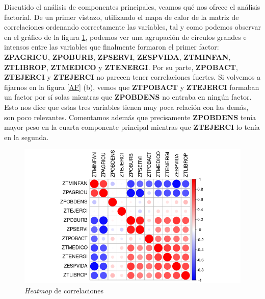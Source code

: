 \documentclass[letterpaper,11pt]{article}
\begin{document}
Discutido el análisis de componentes principales, veamos qué nos ofrece el análisis factorial. De un primer vistazo, utilizando el mapa de calor de la matriz de correlaciones ordenando correctamente las variables, tal y como podemos observar en el gráfico de la figura \ref{correlaciones_AF}, podemos ver una agrupación de círculos grandes e intensos entre las variables que finalmente formaron el primer factor: \textbf{ZPAGRICU}, \textbf{ZPOBURB}, \textbf{ZPSERVI}, \textbf{ZESPVIDA}, \textbf{ZTMINFAN}, \textbf{ZTLIBROP}, \textbf{ZTMEDICO} y \textbf{ZTENERGI}. Por su parte, \textbf{ZPOBACT}, \textbf{ZTEJERCI} y \textbf{ZTEJERCI} no parecen tener correlaciones fuertes. Si volvemos a fijarnos en la figura \ref{AF} (b), vemos que \textbf{ZTPOBACT} y \textbf{ZTEJERCI} formaban un factor por sí solas mientras que \textbf{ZPOBDENS} no entraba en ningún factor. Esto nos dice que estas tres variables tienen muy poca relación con las demás, son poco relevantes. Comentamos además que precisamente \textbf{ZPOBDENS} tenía mayor peso en la cuarta componente principal mientras que \textbf{ZTEJERCI} lo tenía en la segunda.

\begin{figure}[h]
\begin{center}
\includegraphics[scale=0.6]{./img/correlaciones_AF.png}
\end{center}
\caption{\textit{Heatmap} de correlaciones}
\label{correlaciones_AF}
\end{figure}
\end{document}

